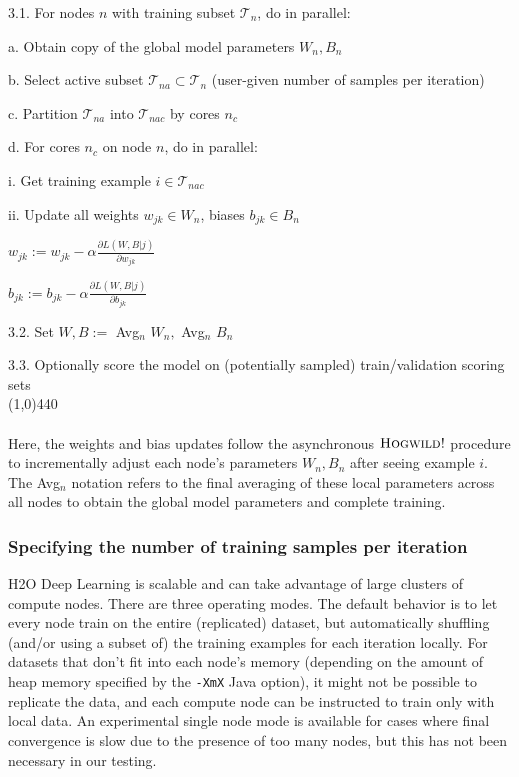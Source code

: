\hspace{1cm} 3.1. For nodes $n$ with training subset $\mathcal{T}_n$, do in parallel:

\hspace{2cm}  a. Obtain copy of the global model parameters $W_n, B_n$

\hspace{2cm}  b. Select active subset $\mathcal{T}_{na} \subset \mathcal{T}_n$ (user-given number of samples per iteration)

\hspace{2cm}  c. Partition $\mathcal{T}_{na}$ into $\mathcal{T}_{nac}$ by cores $n_c$

\hspace{2cm}  d. For cores $n_c$ on node $n$, do in parallel:

\hspace{3cm}  i. Get training example $i \in \mathcal{T}_{nac}$

\hspace{3cm}  ii. Update all weights $w_{jk} \in W_n$, biases $b_{jk} \in B_n$

\hspace{4cm}  $w_{jk} := w_{jk} - \alpha \frac{\partial L(W,B | j)}{\partial w_{jk}}$

\hspace{4cm} $b_{jk} := b_{jk} - \alpha \frac{\partial L(W,B | j)}{\partial b_{jk}}$

\hspace{1cm} 3.2. Set $W,B := $ Avg$_n$ $W_n,$ $ $Avg$_n$ $B_n$

\hspace{1cm} 3.3. Optionally score the model on (potentially sampled) train/validation scoring sets
\\
\line(1,0){440}
\\
\\
Here, the weights and bias updates follow the asynchronous  $\textsc{Hogwild!}$ procedure to incrementally adjust each node's parameters $W_n,B_n$ after seeing example $i$. The Avg$_n$ notation refers to the final averaging of these local parameters across all nodes to obtain the global model parameters and complete training.

\subsubsection{Specifying the number of training samples per iteration} 
\label{sssec:TrainSamplesPerIter}
H2O Deep Learning is scalable and can take advantage of large clusters of compute nodes. There are three operating modes. The default behavior is to let every node train on the entire (replicated) dataset, but automatically  shuffling (and/or using a subset of) the training examples for each iteration locally. For datasets that don't fit into each node's memory (depending on the amount of heap memory specified by the \texttt{-XmX} Java %
option), it might not be possible to replicate the data, and each compute node can be instructed to train only with local data. An experimental single node mode is available for cases where final convergence is slow due to the presence of too many nodes, but this has not been necessary in our testing.

